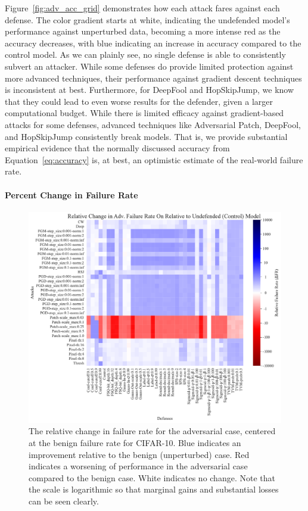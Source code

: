 \documentclass[journal]{IEEEtran}
\begin{document}
Figure~\ref{fig:adv_acc_grid} demonstrates how each attack fares against each defense. The color gradient starts at white, indicating the undefended model's performance against unperturbed data, becoming a more intense red as the accuracy decreases, with blue indicating an increase in accuracy compared to the control model. As we can plainly see, no single defense is able to consistently subvert an attacker.  While some defenses do provide limited protection against more advanced techniques, their performance against gradient descent techniques is inconsistent at best. Furthermore, for DeepFool and HopSkipJump, we know that they could lead to even worse results for the defender, given a larger computational budget. While there is limited efficacy against gradient-based attacks for some defenses, advanced techniques like Adversarial Patch, DeepFool, and HopSkipJump consistently break models. That is, we provide substantial empirical evidence that the normally discussed accuracy from Equation~\ref{eq:accuracy} is, at best, an optimistic estimate of the real-world failure rate.



\paragraph{Percent Change in Failure Rate}
\begin{figure}[!hptb]
    {\centering
    \includegraphics[trim={0 0.85em 0 0.35em},clip,height=0.6\textwidth]{Fig16.pdf}
    \vspace{-0.75em}
    \caption{The relative change in failure rate for the adversarial case, centered at the benign failure rate for CIFAR-10. Blue indicates an improvement relative to the benign (unperturbed) case. Red indicates a worsening of performance in the adversarial case compared to the benign case. White indicates no change. Note that the scale is logarithmic so that marginal gains and substantial losses can be seen clearly.}
    \label{fig:change_grid}
    } %
\end{figure}
\end{document}
